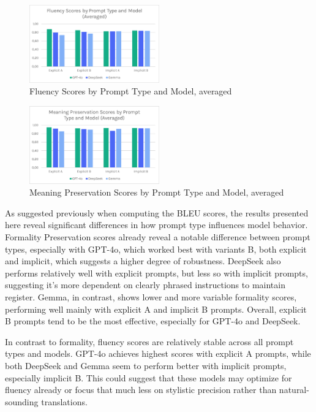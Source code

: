 \documentclass[fleqn,moreauthors,10pt]{ds_report}
\begin{document}
\begin{figure}[h]
	\centering
	\includegraphics[width=0.5\textwidth]{image5.png}
	\caption{Fluency Scores by Prompt Type and Model, averaged}		
	\label{Figure 5}
\end{figure}

\begin{figure}[h]
	\centering
	\includegraphics[width=0.5\textwidth]{image6.png}
	\caption{Meaning Preservation Scores by Prompt Type and Model, averaged}		
	\label{Figure 6}
\end{figure}

As suggested previously when computing the BLEU scores, the results presented here reveal significant differences in how prompt type influences model behavior. Formality Preservation scores already reveal a notable difference between prompt types, especially with GPT-4o, which worked best with variants B, both explicit and implicit, which suggests a higher degree of robustness. DeepSeek also performs relatively well with explicit prompts, but less so with implicit prompts, suggesting it’s more dependent on clearly phrased instructions to maintain register. Gemma, in contrast, shows lower and more variable formality scores, performing well mainly with explicit A and implicit B prompts. Overall, explicit B prompts tend to be the most effective, especially for GPT-4o and DeepSeek.

In contrast to formality, fluency scores are relatively stable across all prompt types and models. GPT-4o achieves highest scores with explicit A prompts, while both DeepSeek and Gemma seem to perform better with implicit prompts, especially implicit B. This could suggest that these models may optimize for fluency already or focus that much less on stylistic precision rather than natural-sounding translations.
\end{document}
